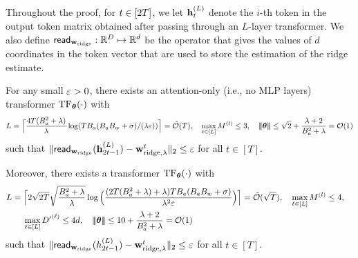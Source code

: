 

Throughout the proof, for $t\in[2{T}]$,  we let ${\mathbf h}_{t}^{(L)}$ denote the $i$-th token in the output token matrix obtained after passing through an $L$-layer transformer. We also define  ${\sf read}_{{\mathbf w}_{\rm ridge}}: \mathbb{R}^{D}\mapsto\mathbb{R}^{d}$ be the operator that gives the values of  $d$ coordinates  in the token vector that are used to store the estimation of  the ridge estimate.


\begin{lemma}\label{lm:approx_ridge}
For any small $\varepsilon>0$, there exists an attention-only (i.e., no MLP layers) transformer ${\rm TF}_{\boldsymbol \theta}(\cdot)$ with 
$$L=\Big\lceil\frac{4T(B_a^2+\lambda)}{\lambda}\log({TB_a(B_aB_w+\sigma)}/({\lambda}\varepsilon))\Big\rceil={\tilde{\mathcal O}}(T),~~~\max_{\ell\in[L]}M^{(l)}\leq3,~~~ {\left|\!\left|\!\left|{{\boldsymbol \theta}}\right|\!\right|\!\right|}\leq  \sqrt{2}+\frac{\lambda+2}{B_a^2+\lambda}=\mathcal{O}(1)$$ such that $\|{\sf read}_{{\mathbf w}_{{\rm ridge}}}({\mathbf h}_{2t-1}^{(L)})-{\mathbf w}^t_{{\rm ridge},\lambda}\|_2\leq\varepsilon$ for all $t\in[T]$. 

Moreover, there exists a  transformer ${\rm TF}_{\boldsymbol \theta}(\cdot)$ with  \begin{align*}&L=\Big\lceil2\sqrt{2T}\sqrt{\frac{B_a^2+\lambda}{\lambda}}\log\Big(\frac{(2T(B_a^2+\lambda)+\lambda)TB_a(B_aB_w+\sigma)}{\lambda^2\eps}\Big)\Big\rceil=\tcO(\sqrt{T}),~~~\max_{\ell\in[L]}M^{(l)}\leq4,~~~ \\
&~~~~~~\max_{\ell\in[L]}\hidden^{\lth}\leq 4d,~~~\nrmp{\btheta}\leq  10+\frac{\lambda+2}{B_a^2+\lambda}=\cO(1) \end{align*}
 such that $\|{\sf read}_{{\mathbf w}_{{\rm ridge}}}(h_{2t-1}^{(L)})-{\mathbf w}^t_{{\rm ridge},\lambda}\|_2\leq\varepsilon$ for all $t\in[T]$. 
\end{lemma}


